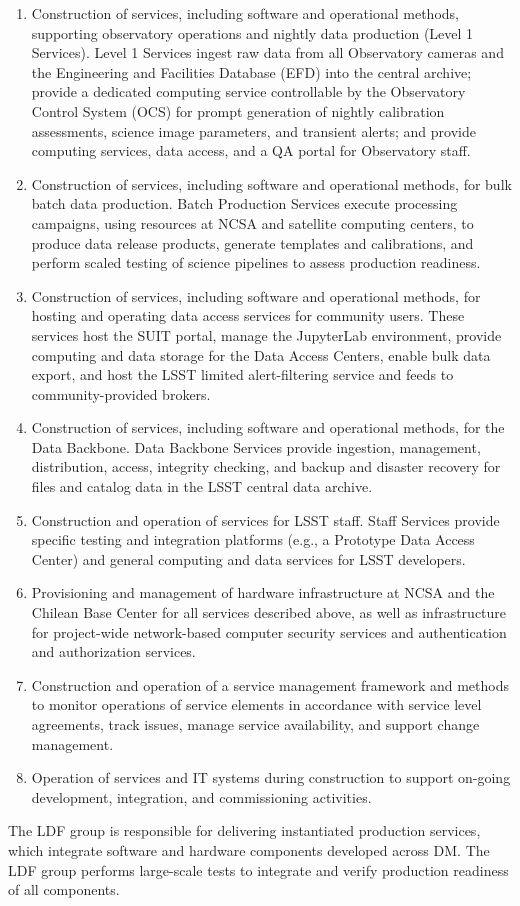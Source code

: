 \begin{enumerate}
	\item	\gls{Construction} of services, including software and operational methods, supporting observatory operations and nightly data production (Level 1 Services). Level 1 Services ingest raw data from all Observatory cameras and the Engineering and Facilities Database (\gls{EFD}) into the central archive; provide a dedicated computing service controllable by the Observatory Control System (\gls{OCS}) for prompt generation of nightly \gls{calibration} assessments, science image parameters, and \gls{transient} alerts; and provide computing services, data access, and a \gls{QA} portal for Observatory staff.
	\item	\gls{Construction} of services, including software and operational methods, for bulk batch data production. \gls{Batch Production} Services execute processing campaigns, using resources at \gls{NCSA} and satellite computing centers, to produce data release products, generate templates and calibrations, and perform scaled testing of science pipelines to assess production readiness.
	\item	\gls{Construction} of services, including software and operational methods, for hosting and operating data access services for community users. These services host the \gls{SUIT} portal, manage the JupyterLab environment, provide computing and data storage for the Data Access Centers, enable bulk data export, and host the \gls{LSST} limited alert-filtering service and feeds to community-provided brokers.
	\item	\gls{Construction} of services, including software and operational methods, for the \gls{Data Backbone}. \gls{Data Backbone} Services provide ingestion, management, distribution, access, integrity checking, and backup and disaster recovery for files and catalog data in the \gls{LSST} central data archive.
	\item	\gls{Construction} and operation of services for \gls{LSST} staff. Staff Services provide specific testing and integration platforms (e.g., a Prototype \gls{Data Access Center}) and general computing and data services for \gls{LSST} developers.
	\item	Provisioning and management of hardware infrastructure at NCSA and the Chilean Base Center for all services described above, as well as infrastructure for project-wide network-based computer security services and authentication and authorization services.
	\item	\gls{Construction} and operation of a service management framework and methods to monitor operations of service elements in accordance with service level agreements, track issues, manage service availability, and support change management.
	\item	Operation of services and \gls{IT} systems during construction to support on-going development, integration, and commissioning activities.
\end{enumerate}
The \gls{LDF} group is responsible for delivering instantiated production services, which integrate software and hardware components developed across \gls{DM}. The \gls{LDF} group performs large-scale tests to integrate and verify production readiness of all components.
